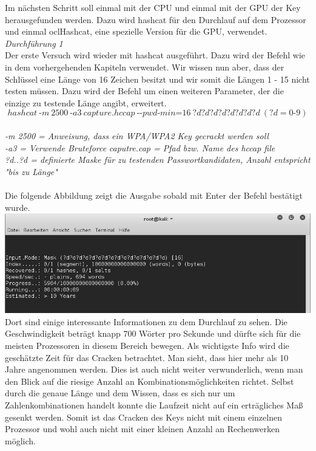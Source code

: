 Im nächsten Schritt soll einmal mit der CPU und einmal mit der GPU der Key herausgefunden werden. Dazu wird hashcat für den Durchlauf auf dem Prozessor und einmal oclHashcat, eine spezielle Version für die GPU, verwendet.\\ 

\textit{Durchführung 1}\\

Der erste Versuch wird wieder mit hashcat ausgeführt. Dazu wird der Befehl wie in dem vorhergehenden Kapiteln verwendet. Wir wissen nun aber, dass der Schlüssel eine Länge von 16 Zeichen besitzt und wir somit die Längen 1 - 15 nicht testen müssen. Dazu wird der Befehl um einen weiteren Parameter, der die einzige zu testende Länge angibt, erweitert.
$$hashcat~\text{-}m~2500~\text{-}a3~capture.hccap~\text{-}\text{-}pwd\text{-}min\text{=}16~?d?d?d?d?d?d?d?d~(?d = 0\text{-}9)$$\\

\textit{-m 2500 = Anweisung, dass ein WPA/WPA2 Key gecrackt werden soll}\\
\textit{-a3 = Verwende Bruteforce}
\textit{caputre.cap = Pfad bzw. Name des hccap file}\\
\textit{?d..?d = definierte Maske für zu testenden Passwortkandidaten, Anzahl entspricht "bis zu Länge"\\}\\


Die folgende Abbildung zeigt die Ausgabe sobald mit Enter der Befehl bestätigt wurde.\\

\includegraphics[width=\textwidth]{bilder/wlan/wlan_screenshot_1.png}\\

Dort sind einige interessante Informationen zu dem Durchlauf zu sehen. Die Geschwindigkeit beträgt knapp 700 Wörter pro Sekunde und dürfte sich für die meisten Prozessoren in diesem Bereich bewegen.
Als wichtigste Info wird die geschätzte Zeit für das Cracken betrachtet. Man sieht, dass hier mehr als 10 Jahre angenommen werden. Dies ist auch nicht weiter verwunderlich, wenn man den Blick auf die riesige Anzahl an Kombinationsmöglichkeiten richtet. Selbst durch die genaue Länge und dem Wissen, dass es sich nur um Zahlenkombinationen handelt konnte die Laufzeit nicht auf ein erträgliches Maß gesenkt werden. Somit ist das Cracken des Keys nicht mit einem einzelnen Prozessor und wohl auch nicht mit einer kleinen Anzahl an Rechenwerken möglich.\\

